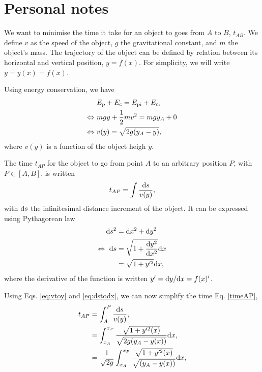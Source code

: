 \documentclass{article}
\begin{document}
\newpage
\section*{Personal notes}

We want to minimise the time it take for an object to goes from $A$ to $B$, $t_{AB}$. We define $v$ as the speed of the object, $g$ the gravitational constant, and $m$ the object's mass. The trajectory of the object can be defined by relation between its horizontal and vertical position, $y = f(x)$. For simplicity, we will write $y = y(x) = f(x)$.

Using energy conservation, we have
\begin{align}
  &E_{\text p} + E_{\text c} = E_{\text{pi}} + E_{\text{ci}}\nonumber\\
\Leftrightarrow~ & mgy + \frac 12 m v^2 = mgy_A + 0\nonumber\\
\Leftrightarrow~& v(y) = \sqrt{2 g(y_A - y)}, \label{eq:vtoy}
\end{align}
where $v(y)$ is a function of the object heigh $y$.

The time $t_{AP}$ for the object to go from point $A$ to an arbitrary position $P$, with $P\in[A, B]$, is written
\begin{align}
t_{AP} = \int \frac{\text d s }{v(y)}, \label{timeAP}
\end{align}
with $\text d s $ the infinitesimal distance increment of the object. It can be expressed using Pythagorean law
\begin{align}
\text d s^2  &= \text d x^2 + \text d y^2 \nonumber\\
\Leftrightarrow~ \text d s &= \sqrt{1 + \frac{\text d y^2}{\text d x^2}}\text d x\nonumber\\
 & = \sqrt{1 + y'^2}\text d x,\label{eq:dstodx}
\end{align}
where the derivative of the function is written $y' = \text d y/\text d x = f(x)'$.

Using Eqs. \eqref{eq:vtoy} and \eqref{eq:dstodx}, we can now simplify the time Eq. \eqref{timeAP},
\begin{align}
t_{AP} &= \int_A^P \frac{\text d s }{v(y)},\nonumber\\
&= \int_{x_A}^{x_P} \frac{\sqrt{1 + y'^2(x)}}{\sqrt{2 g(y_A - y(x))}} \text d x,\nonumber\\
&= \frac 1{\sqrt{2 g}} \int_{x_A}^{x_P} \frac{\sqrt{1 + y'^2(x)}}{\sqrt{(y_A - y(x))}} \text d x, \label{eq:tAP}
\end{align}
\end{document}
